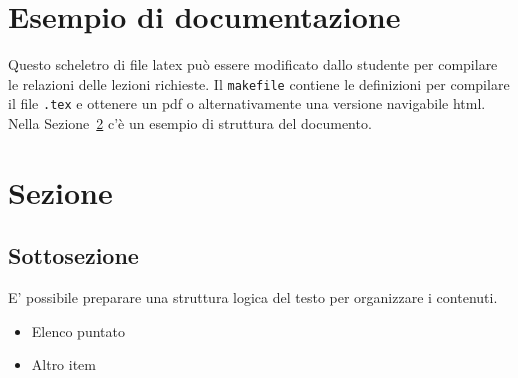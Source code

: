 \documentclass{article}
\begin{document}
\section{Esempio di documentazione}
Questo scheletro di file latex pu\`o essere modificato dallo studente
per compilare le relazioni delle lezioni richieste.
Il {\tt makefile} contiene le definizioni per compilare il file {\tt .tex}
e ottenere un pdf o alternativamente una versione navigabile html.
Nella Sezione~\ref{sec:dettagli} c'\`e un esempio di struttura del documento.

\section{Sezione}
\label{sec:dettagli}
\subsection{Sottosezione}
E' possibile preparare una struttura logica del testo per organizzare i contenuti.
\begin{itemize}
\item Elenco puntato
\item Altro item
\end{itemize}
\end{document}
